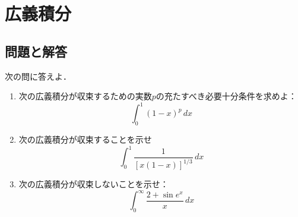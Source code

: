 \documentclass{jsarticle}
\theoremstyle{definition}
\begin{document}
\section{広義積分}
\subsection{問題と解答}

\begin{screen}
次の問に答えよ．
\begin{enumerate}
\item 次の広義積分が収束するための実数$p$の充たすべき必要十分条件を求めよ：
\[ \int_0^1(1-x)^p\,dx \]
\item 次の広義積分が収束することを示せ
\[ \int_0^1\frac{1}{[x(1-x)]^{1/3}}\,dx \]
\item 次の広義積分が収束しないことを示せ：
\[ \int_0^\infty\frac{2+\sin{e^x}}{x}\,dx \]
\end{enumerate}
\end{screen}
\end{document}
